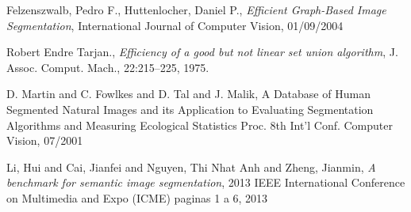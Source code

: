 \documentclass[10pt,a4paper]{article}
\begin{document}


\maketitle

\clearpage
\tableofcontents

\clearpage

\clearpage


\clearpage


\clearpage


\clearpage


\clearpage

\begin{thebibliography}{9}

    Felzenszwalb, Pedro F., Huttenlocher, Daniel P.,
    \textit{Efficient Graph-Based Image Segmentation},
	International Journal of Computer Vision, 01/09/2004

	Robert Endre Tarjan.,
	\textit{Efficiency of a good but not linear set union algorithm},
	J. Assoc. Comput. Mach., 22:215–225, 1975.

	D. Martin and C. Fowlkes and D. Tal and J. Malik,
	A Database of Human Segmented Natural Images and its Application to Evaluating Segmentation Algorithms and Measuring Ecological Statistics
	Proc. 8th Int'l Conf. Computer Vision, 07/2001

  Li, Hui and Cai, Jianfei and Nguyen, Thi Nhat Anh and Zheng, Jianmin,
  \textit{A benchmark for semantic image segmentation},
  2013 IEEE International Conference on Multimedia and Expo (ICME)
  paginas 1 a 6, 2013



\end{thebibliography}
\end{document}
